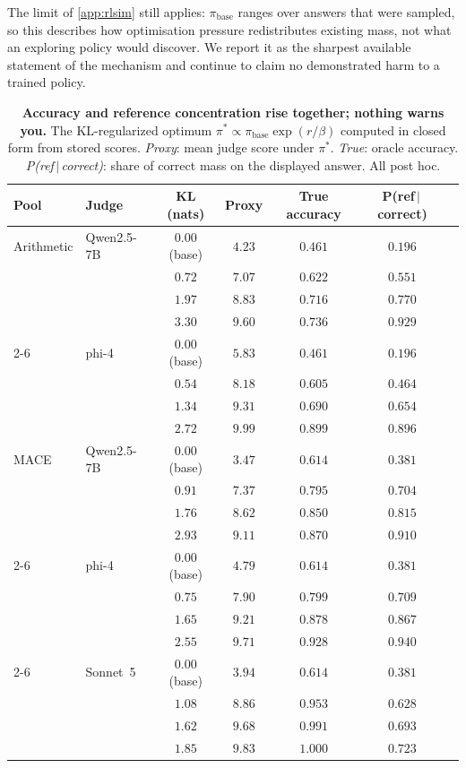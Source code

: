 The limit of \cref{app:rlsim} still applies: $\pi_{\text{base}}$ ranges over answers that were
sampled, so this describes how optimisation pressure redistributes existing mass, not what an
exploring policy would discover. We report it as the sharpest available statement of the mechanism
and continue to claim no demonstrated harm to a trained policy.

\begin{table}[htbp]
\centering
\footnotesize
\caption{\textbf{Accuracy and reference concentration rise together; nothing warns you.} The
KL-regularized optimum $\pi^{*} \propto \pi_{\text{base}}\exp(r/\beta)$ computed in closed form from
stored scores. \emph{Proxy}: mean judge score under $\pi^{*}$. \emph{True}: oracle accuracy.
\emph{P(ref\,$\vert$\,correct)}: share of correct mass on the displayed answer. All post hoc.\ph}
\label{tab:kltilt}
\setlength{\tabcolsep}{4pt}
\begin{tabular}{@{}llccccc@{}}
\toprule
Pool & Judge & KL (nats) & Proxy & True accuracy & P(ref\,$\vert$\,correct) \\
\midrule
Arithmetic & Qwen2.5-7B & $0.00$ (base) & $4.23$ & $0.461$ & $0.196$ \\
 & & $0.72$ & $7.07$ & $0.622$ & $0.551$ \\
 & & $1.97$ & $8.83$ & $0.716$ & $0.770$ \\
 & & $3.30$ & $9.60$ & $0.736$ & $0.929$ \\
\cmidrule(l){2-6}
 & phi-4 & $0.00$ (base) & $5.83$ & $0.461$ & $0.196$ \\
 & & $0.54$ & $8.18$ & $0.605$ & $0.464$ \\
 & & $1.34$ & $9.31$ & $0.690$ & $0.654$ \\
 & & $2.72$ & $9.99$ & $0.899$ & $0.896$ \\
\midrule
\textsc{MACE} & Qwen2.5-7B & $0.00$ (base) & $3.47$ & $0.614$ & $0.381$ \\
 & & $0.91$ & $7.37$ & $0.795$ & $0.704$ \\
 & & $1.76$ & $8.62$ & $0.850$ & $0.815$ \\
 & & $2.93$ & $9.11$ & $0.870$ & $0.910$ \\
\cmidrule(l){2-6}
 & phi-4 & $0.00$ (base) & $4.79$ & $0.614$ & $0.381$ \\
 & & $0.75$ & $7.90$ & $0.799$ & $0.709$ \\
 & & $1.65$ & $9.21$ & $0.878$ & $0.867$ \\
 & & $2.55$ & $9.71$ & $0.928$ & $0.940$ \\
\cmidrule(l){2-6}
 & Sonnet~5 & $0.00$ (base) & $3.94$ & $0.614$ & $0.381$ \\
 & & $1.08$ & $8.86$ & $0.953$ & $0.628$ \\
 & & $1.62$ & $9.68$ & $0.991$ & $0.693$ \\
 & & $1.85$ & $9.83$ & $1.000$ & $0.723$ \\
\bottomrule
\end{tabular}
\end{table}